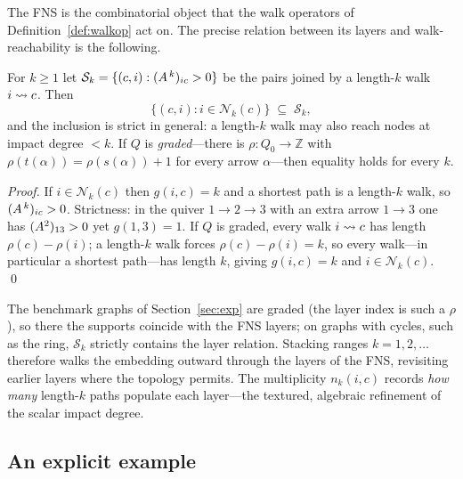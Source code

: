 The FNS is the combinatorial object that the walk operators of
Definition~\ref{def:walkop} act on. The precise relation between its layers and
walk-reachability is the following.

\begin{proposition}\label{prop:fns}
For $k\ge1$ let $\mathcal{S}_k=\{(c,i):(A^{\,k})_{ic}>0\}$ be the pairs
joined by a length-$k$ walk $i\rightsquigarrow c$. Then
\[
  \{(c,i): i\in \mathcal{N}_k(c)\} \;\subseteq\; \mathcal{S}_k ,
\]
and the inclusion is strict in general: a length-$k$ walk may also reach nodes
at impact degree $<k$. If $Q$ is \emph{graded}---there is
$\rho\colon Q_0\to\mathbb{Z}$ with $\rho(t(\alpha))=\rho(s(\alpha))+1$ for every
arrow $\alpha$---then equality holds for every $k$.
\end{proposition}

\begin{proof}
If $i\in\mathcal{N}_k(c)$ then $g(i,c)=k$ and a shortest path is a length-$k$
walk, so $(A^{\,k})_{ic}>0$. Strictness: in the quiver $1\to2\to3$ with an
extra arrow $1\to3$ one has $(A^{2})_{13}>0$ yet $g(1,3)=1$. If $Q$ is
graded, every walk $i\rightsquigarrow c$ has length $\rho(c)-\rho(i)$; a length-$k$ walk
forces $\rho(c)-\rho(i)=k$, so every walk---in particular a shortest
path---has length $k$, giving $g(i,c)=k$ and $i\in\mathcal{N}_k(c)$. \qed
\end{proof}

The benchmark graphs of Section~\ref{sec:exp} are graded (the layer index is
such a $\rho$), so there the supports coincide with the FNS layers; on graphs
with cycles, such as the ring, $\mathcal{S}_k$ strictly contains the layer
relation. Stacking ranges $k=1,2,\dots$ therefore walks the embedding outward
through the layers of the FNS, revisiting earlier layers where the topology
permits. The multiplicity $n_k(i,c)$ records \emph{how many} length-$k$ paths
populate each layer---the textured, algebraic refinement of the scalar impact
degree.

\subsection{An explicit example}

